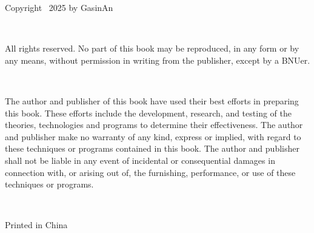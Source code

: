 \noindent Copyright \textcopyright~2025 by GasinAn

\ 

\noindent All rights reserved. No part of this book may be reproduced, 
in any form or by any means, without permission in writing from the publisher, except by a BNUer.

\ 

\noindent The author and publisher of this book have used their best efforts
in preparing this book. These efforts include the development, research, and testing of the theories,
technologies and programs to determine their effectiveness.
The author and publisher make no warranty of any kind, express or implied,
with regard to these techniques or programs contained in this book.
The author and publisher shall not be liable in any event of incidental or consequential damages
in connection with, or arising out of, the furnishing, performance, or use of these techniques or programs.

\ 

\noindent Printed in China
